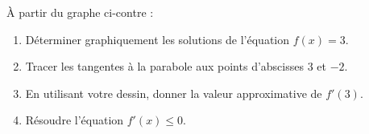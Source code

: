 
\begin{exercice}\label{exosmath-0422}

   \begin{minipage}{8cm}
       À partir du graphe ci-contre :
\begin{enumerate}
    \item
        Déterminer graphiquement les solutions de l'équation \( f(x)=3\).
    \item
        Tracer les tangentes à la parabole aux points d'abscisses \( 3\) et \( -2\).
    \item
        En utilisant votre dessin, donner la valeur approximative de \( f'(3)\).
    \item
        Résoudre l'équation \( f'(x)\leq 0\).
\end{enumerate}
   \end{minipage}
   \begin{minipage}{8cm}
   
   \end{minipage}
       
\end{exercice}
